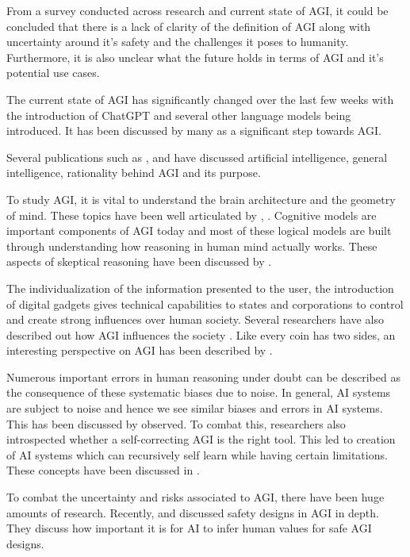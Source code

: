 \documentclass{article}
\begin{document}
From a survey conducted across research and current state of AGI, it could be concluded that there is a lack of clarity of the definition of AGI along with uncertainty around it's safety and the challenges it poses to humanity. Furthermore, it is also unclear what the future holds in terms of AGI and it's potential use cases.

The current state of AGI has significantly changed over the last few weeks with the introduction of ChatGPT and several other language models being introduced. It has been discussed by many as a significant step towards AGI.

Several publications such as \citet{gust2011rationality}, \citet{schneider2013models} and \citet{tarek2013intelligence} have discussed artificial intelligence, general intelligence, rationality behind AGI and its purpose.

To study AGI, it is vital to understand the brain architecture and the geometry of mind. These topics have been well articulated by \citet{YAMAKAWA2021478}, \citet{goertzel2011mind}. Cognitive models are important components of AGI today and most of these logical models are built through understanding how reasoning in human mind actually works. These aspects of skeptical reasoning have been discussed by \citet{gregorie2014reasoning}.

The individualization of the information presented to the user, the introduction of digital gadgets gives technical capabilities to states and corporations to control and create strong influences over human society. Several researchers have also described out how AGI influences the society \citet{MALINETSKY2021344}. Like every coin has two sides, an interesting perspective on AGI has been described by  \citet{GRUNDNER20211PERSPECTIVE}.

Numerous important errors in human reasoning under doubt can be described as the consequence of these systematic biases due to noise. In general, AI systems are subject to noise and hence we see similar biases and errors in AI systems. This has been discussed by \citet{costello2012errorjudgement} observed. To combat this, researchers also introspected whether a self-correcting AGI is the right tool. This led to creation of AI systems which can recursively self learn while having certain limitations. These concepts have been discussed in \citet{roman2015selfimproving}.

To combat the uncertainty and risks associated to AGI, there have been huge amounts of research. Recently, \citet{sezener2015safedesign} and \citet{bieger2015safeagi} discussed safety designs in AGI in depth. They discuss how important it is for AI to infer human values for safe AGI designs.
\end{document}
